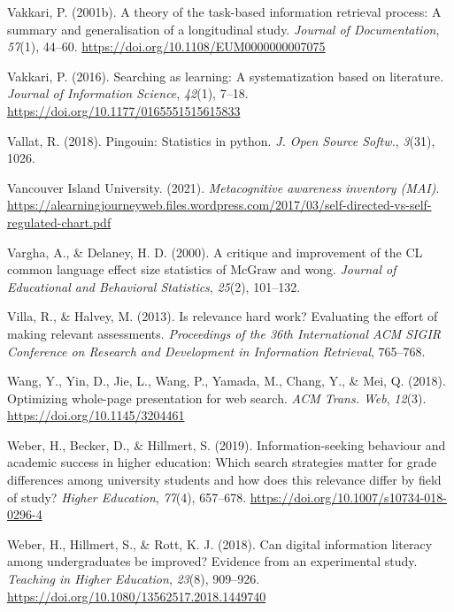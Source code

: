 \documentclass[letterpaper, nobind]{templates/ociamthesis}
\newlength{\cslhangindent}
\newenvironment{CSLReferences}[2] %
 {%
  \setlength{\parindent}{0pt}
  \ifodd #1
  \let\oldpar\par
  \def\par{\hangindent=\cslhangindent\oldpar}
  \fi
  \setlength{\parskip}{1mm}
  \setlength{\baselineskip}{6mm}
 }%
 {}
\begin{document}
\begin{CSLReferences}{1}{0}
\leavevmode{}%
Vakkari, P. (2001b). A theory of the task-based information retrieval process: A summary and generalisation of a longitudinal study. \emph{Journal of Documentation}, \emph{57}(1), 44--60. \url{https://doi.org/10.1108/EUM0000000007075}

\leavevmode{}%
Vakkari, P. (2016). Searching as learning: A systematization based on literature. \emph{Journal of Information Science}, \emph{42}(1), 7--18. \url{https://doi.org/10.1177/0165551515615833}

\leavevmode{}%
Vallat, R. (2018). Pingouin: Statistics in python. \emph{J. Open Source Softw.}, \emph{3}(31), 1026.

\leavevmode{}%
Vancouver Island University. (2021). \emph{Metacognitive awareness inventory (MAI)}. \url{https://alearningjourneyweb.files.wordpress.com/2017/03/self-directed-vs-self-regulated-chart.pdf}

\leavevmode{}%
Vargha, A., \& Delaney, H. D. (2000). A critique and improvement of the CL common language effect size statistics of McGraw and wong. \emph{Journal of Educational and Behavioral Statistics}, \emph{25}(2), 101--132.

\leavevmode{}%
Villa, R., \& Halvey, M. (2013). Is relevance hard work? Evaluating the effort of making relevant assessments. \emph{Proceedings of the 36th International ACM SIGIR Conference on Research and Development in Information Retrieval}, 765--768.

\leavevmode{}%
Wang, Y., Yin, D., Jie, L., Wang, P., Yamada, M., Chang, Y., \& Mei, Q. (2018). Optimizing whole-page presentation for web search. \emph{ACM Trans. Web}, \emph{12}(3). \url{https://doi.org/10.1145/3204461}

\leavevmode{}%
Weber, H., Becker, D., \& Hillmert, S. (2019). Information-seeking behaviour and academic success in higher education: Which search strategies matter for grade differences among university students and how does this relevance differ by field of study? \emph{Higher Education}, \emph{77}(4), 657--678. \url{https://doi.org/10.1007/s10734-018-0296-4}

\leavevmode{}%
Weber, H., Hillmert, S., \& Rott, K. J. (2018). Can digital information literacy among undergraduates be improved? Evidence from an experimental study. \emph{Teaching in Higher Education}, \emph{23}(8), 909--926. \url{https://doi.org/10.1080/13562517.2018.1449740}


\end{CSLReferences}
\end{document}
